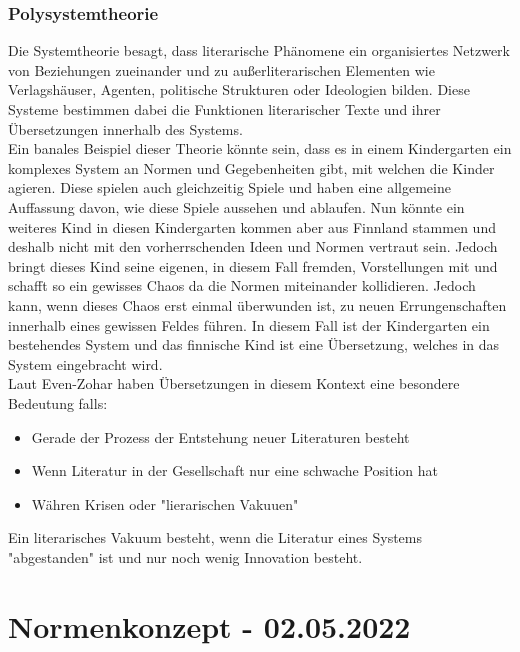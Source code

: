 \documentclass{article}
\begin{document}
	\subsubsection{Polysystemtheorie}
	Die Systemtheorie besagt, dass literarische Phänomene ein organisiertes Netzwerk von Beziehungen zueinander und zu außerliterarischen Elementen wie Verlagshäuser, Agenten, politische Strukturen oder Ideologien bilden. Diese Systeme bestimmen dabei die Funktionen literarischer Texte und ihrer Übersetzungen innerhalb des Systems. \\
	Ein banales Beispiel dieser Theorie könnte sein, dass es in einem Kindergarten ein komplexes System an Normen und Gegebenheiten gibt, mit welchen die Kinder agieren. Diese spielen auch gleichzeitig Spiele und haben eine allgemeine Auffassung davon, wie diese Spiele aussehen und ablaufen. Nun könnte ein weiteres Kind in diesen Kindergarten kommen aber aus Finnland stammen und deshalb nicht mit den vorherrschenden Ideen und Normen vertraut sein. Jedoch bringt dieses Kind seine eigenen, in diesem Fall fremden, Vorstellungen mit und schafft so ein gewisses Chaos da die Normen miteinander kollidieren. Jedoch kann, wenn dieses Chaos erst einmal überwunden ist, zu neuen Errungenschaften innerhalb eines gewissen Feldes führen. In diesem Fall ist der Kindergarten ein bestehendes System und das finnische Kind ist eine Übersetzung, welches in das System eingebracht wird. \\
	Laut Even-Zohar haben Übersetzungen in diesem Kontext eine besondere Bedeutung falls:
	\begin{itemize}
		\item{Gerade der Prozess der Entstehung neuer Literaturen besteht}
		\item{Wenn Literatur in der Gesellschaft nur eine schwache Position hat}
		\item{Währen Krisen oder "lierarischen Vakuuen"}
	\end{itemize}

	Ein literarisches Vakuum besteht, wenn die Literatur eines Systems "abgestanden" ist und nur noch wenig Innovation besteht. \\

	\section{Normenkonzept - 02.05.2022}
\end{document}
